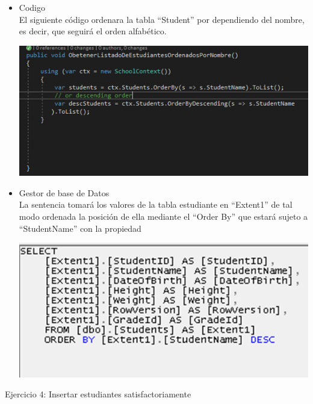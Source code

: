 \begin{itemize}
	\item Codigo
	\\El siguiente código ordenara la tabla “Student” por dependiendo del nombre, es decir, que seguirá el orden alfabético.

	\begin{center}
	\includegraphics[width=15cm]{./Imagenes/3a} 
	\end{center}

	\item Gestor de base de Datos 
	\\La sentencia tomará los valores de la tabla estudiante en “Extent1” de tal modo ordenada la posición de ella mediante el “Order By” que estará sujeto a “StudentName” con la propiedad  
	\begin{center}
	\includegraphics[width=15cm]{./Imagenes/3b} 
	\end{center}
	
\end{itemize} 
\newpage
Ejercicio 4: Insertar estudiantes satisfactoriamente

